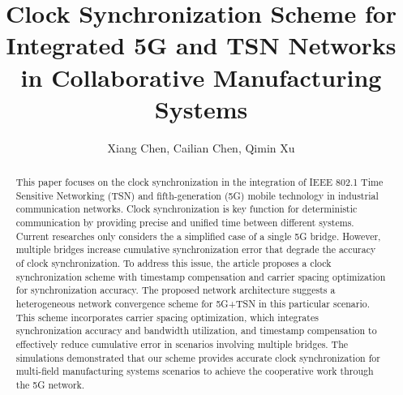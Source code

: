 \documentclass[english]{cccconf}
\begin{document}
\title{Clock Synchronization Scheme for Integrated 5G and TSN Networks in Collaborative Manufacturing Systems}
	

\author{Xiang Chen,
	Cailian Chen,
	Qimin Xu}




\maketitle
\begin{abstract}
This paper focuses on the clock synchronization in the integration of IEEE 802.1 Time Sensitive Networking (TSN) and fifth-generation (5G) mobile technology in industrial communication networks. Clock synchronization is key function for deterministic communication by providing precise and unified time between different systems. Current researches only considers the a simplified  case of a single 5G bridge. However, multiple bridges increase cumulative synchronization error that degrade the accuracy of clock synchronization. To address this issue, the article proposes a clock synchronization scheme with timestamp compensation and carrier spacing optimization for synchronization accuracy. The proposed network architecture suggests a heterogeneous network convergence scheme for 5G+TSN in this particular scenario. This scheme incorporates carrier spacing optimization, which integrates synchronization accuracy and bandwidth utilization, and timestamp compensation to effectively reduce cumulative error in scenarios involving multiple bridges. The simulations demonstrated that our scheme provides accurate clock synchronization for multi-field manufacturing systems scenarios to achieve the cooperative work through the 5G network.
\end{abstract}
\end{document}
